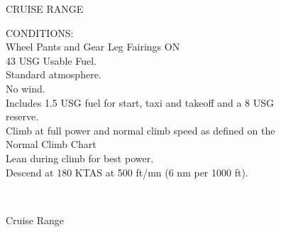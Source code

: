 \begin{figure}[t]
\begin{center}
\begin{perfhdr}CRUISE RANGE\\
\end{perfhdr}

\begin{minipage}{5in}
  \begin{flushleft}
    CONDITIONS:\\
    Wheel Pants and Gear Leg Fairings ON\\
    43 USG Usable Fuel.\\
    Standard atmosphere.\\
    No wind.\\
    Includes 1.5 USG fuel for start, taxi and takeoff and a 8 USG reserve.\\
    Climb at full power and normal climb speed as defined on the Normal Climb Chart\\
    Lean during climb for best power.\\
    Descend at 180 KTAS at 500 ft/mn (6 nm per 1000 ft).\\
    \end{flushleft}
\end{minipage}\\
\vspace{5ex}
\end{center}  %
\caption{Cruise Range}
\label{Cruise-range}
\end{figure}
\clearpage



